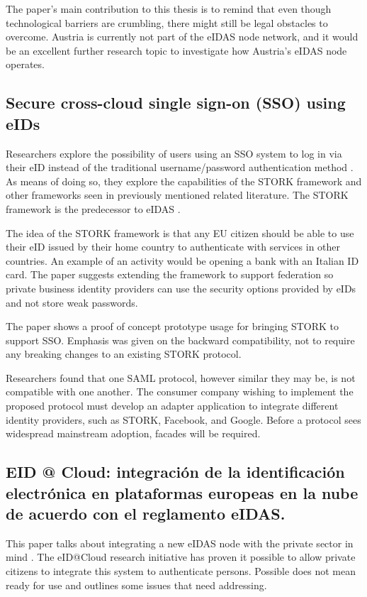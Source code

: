 The paper's main contribution to this thesis is to remind that even though technological barriers are crumbling, there might still be legal obstacles to overcome. Austria is currently not part of the eIDAS node network, and it would be an excellent further research topic to investigate how Austria's eIDAS node operates.

\subsection{Secure cross-cloud single sign-on (SSO) using eIDs}

Researchers explore the possibility of users using an SSO system to log in via their eID instead of the traditional username/password authentication method \cite{secure-signon}. As means of doing so, they explore the capabilities of the STORK framework and other frameworks seen in previously mentioned related literature. The STORK framework is the predecessor to eIDAS \cite{stork}.

The idea of the STORK framework is that any EU citizen should be able to use their eID issued by their home country to authenticate with services in other countries. An example of an activity would be opening a bank with an Italian ID card. The paper suggests extending the framework to support federation so private business identity providers can use the security options provided by eIDs and not store weak passwords.

The paper shows a proof of concept prototype usage for bringing STORK to support SSO. Emphasis was given on the backward compatibility, not to require any breaking changes to an existing STORK protocol.

Researchers found that one SAML protocol, however similar they may be, is not compatible with one another. The consumer company wishing to implement the proposed protocol must develop an adapter application to integrate different identity providers, such as STORK, Facebook, and Google. Before a protocol sees widespread mainstream adoption, facades will be required.

\subsection{EID @ Cloud: integración de la identificación electrónica en plataformas europeas en la nube de acuerdo con el reglamento eIDAS.}

This paper talks about integrating a new eIDAS node with the private sector in mind \cite{guerola2019eid}. The eID@Cloud research initiative has proven it possible to allow private citizens to integrate this system to authenticate persons. Possible does not mean ready for use and outlines some issues that need addressing.

